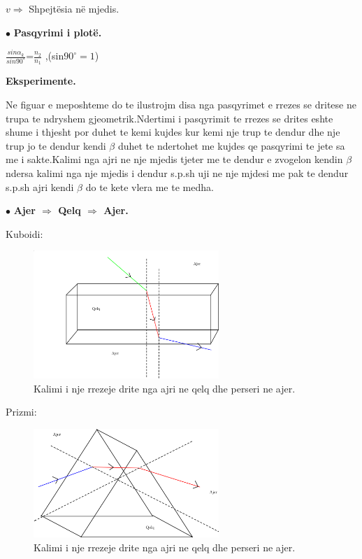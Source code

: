 \documentclass[twocolumn]{article}
\begin{document}
$v \Rightarrow$ Shpejtësia në mjedis.

$\bullet$ \textbf{Pasqyrimi i plotë.}

$\frac{sin\alpha_k}{sin90^\circ}$=$\frac{n_2}{n_1}$ ,(sin$90^\circ=1$)


\begin{center}
	\textbf{Eksperimente.}
\end{center}
Ne figuar e meposhteme do te ilustrojm disa  nga pasqyrimet e rrezes se dritese ne trupa te ndryshem gjeometrik.Ndertimi i pasqyrimit te rrezes se drites eshte shume i thjesht por duhet te kemi kujdes kur kemi nje trup te dendur dhe nje trup jo te dendur kendi $\beta$ duhet te ndertohet me kujdes qe pasqyrimi te jete sa me i sakte.Kalimi nga ajri ne nje mjedis tjeter me te dendur e zvogelon kendin $\beta$ ndersa kalimi nga nje mjedis i dendur s.p.sh uji ne nje mjdesi me pak te dendur s.p.sh ajri kendi $\beta$ do te kete vlera me te medha.
\begin{center}
$\bullet$ \textbf{Ajer $\Rightarrow$ Qelq $\Rightarrow$ Ajer.}
	

\end{center}

\begin{center}
	Kuboidi:
\end{center}
\begin{figure}[h]
	\includegraphics[width=70mm]{Imazhet/ajer-qelq-ajer.png}
	\caption{Kalimi i nje rrezeje drite nga ajri ne qelq dhe perseri ne ajer.}
	\label{fig:boat1}
\end{figure}

\begin{center}
	Prizmi:
\end{center}
\begin{figure}[h]
	\includegraphics[width=70mm]{Imazhet/ajer-qelqprizmi-ajer.png}
	\caption{Kalimi i nje rrezeje drite nga ajri ne qelq dhe perseri ne ajer.}
	\label{fig:boat1}
\end{figure}
\end{document}
